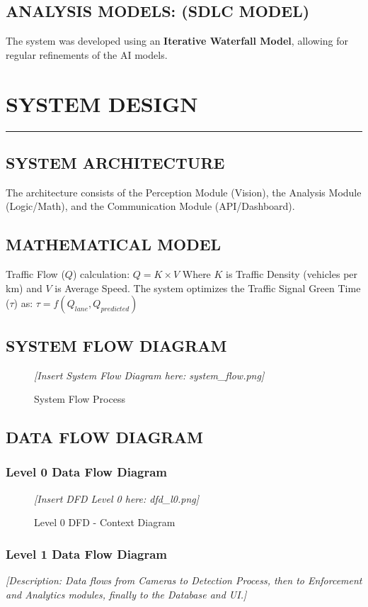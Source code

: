 \documentclass[12pt,times,a4paper]{report}
\newcommand\HRule{\rule{\textwidth}{1pt}}
\begin{document}
\section{ANALYSIS MODELS: (SDLC MODEL)}
The system was developed using an \textbf{Iterative Waterfall Model}, allowing for regular refinements of the AI models.

\chapter{SYSTEM DESIGN}
\HRule
\section{SYSTEM ARCHITECTURE}
The architecture consists of the Perception Module (Vision), the Analysis Module (Logic/Math), and the Communication Module (API/Dashboard).

\section{MATHEMATICAL MODEL}
Traffic Flow ($Q$) calculation: 
$Q = K \times V$ 
Where $K$ is Traffic Density (vehicles per km) and $V$ is Average Speed. The system optimizes the Traffic Signal Green Time ($\tau$) as:
$\tau = f(Q_{lane}, Q_{predicted})$

\section{SYSTEM FLOW DIAGRAM}
\begin{figure}[h!]
    \centering
    \textit{[Insert System Flow Diagram here: system_flow.png]}
    \caption{System Flow Process}
\end{figure}

\section{DATA FLOW DIAGRAM}
\subsection{Level 0 Data Flow Diagram}
\begin{figure}[h!]
    \centering
    \textit{[Insert DFD Level 0 here: dfd_l0.png]}
    \caption{Level 0 DFD - Context Diagram}
\end{figure}
\subsection{Level 1 Data Flow Diagram}
\textit{[Description: Data flows from Cameras to Detection Process, then to Enforcement and Analytics modules, finally to the Database and UI.]}
\end{document}
